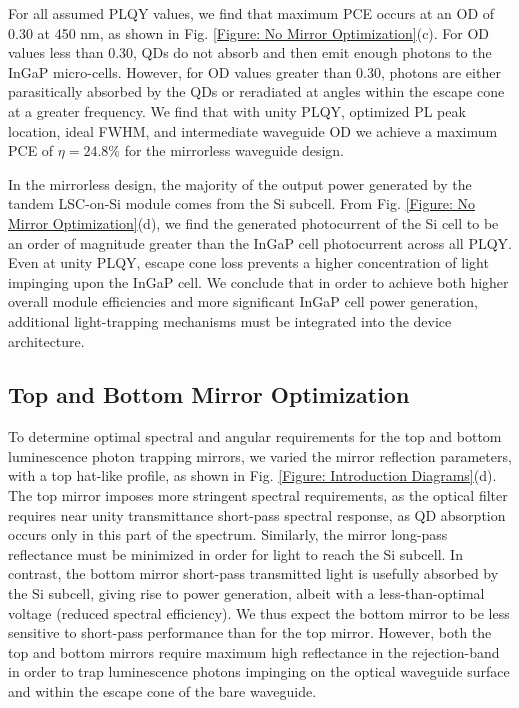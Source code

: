 \documentclass[conference]{./pvsctran}
\begin{document}
		For all assumed PLQY values, we find that maximum PCE occurs at an OD of 0.30 at 450 nm, as shown in Fig. \ref{Figure: No Mirror Optimization}(c). For OD values less than 0.30, QDs do not absorb and then emit enough photons to the InGaP micro-cells. However, for OD values greater than 0.30, photons are either parasitically absorbed by the QDs or reradiated at angles within the escape cone at a greater frequency. We find that with unity PLQY, optimized PL peak location, ideal FWHM, and intermediate waveguide OD we achieve a maximum PCE of $\eta = 24.8\%$ for the mirrorless waveguide design. 
		
		In the mirrorless design, the majority of the output power generated by the tandem LSC-on-Si module comes from the Si subcell. From Fig. \ref{Figure: No Mirror Optimization}(d), we find the generated photocurrent of the Si cell to be an order of magnitude greater than the InGaP cell photocurrent across all PLQY. Even at unity PLQY, escape cone loss prevents a higher concentration of light impinging upon the InGaP cell. We conclude that in order to achieve both higher overall module efficiencies and more significant InGaP cell power generation, additional light-trapping mechanisms must be integrated into the device architecture. 
		
		\subsection*{Top and Bottom Mirror Optimization}
		
		To determine optimal spectral and angular requirements for the top and bottom luminescence photon trapping mirrors, we varied the mirror reflection parameters, with a top hat-like profile, as shown in Fig. \ref{Figure: Introduction Diagrams}(d). The top mirror imposes more stringent spectral requirements, as the optical filter requires near unity transmittance short-pass spectral response, as QD absorption occurs only in this part of the spectrum. Similarly, the mirror long-pass reflectance must be minimized in order for light to reach the Si subcell. In contrast, the bottom mirror short-pass transmitted light is usefully absorbed by the Si subcell, giving rise to power generation, albeit with a less-than-optimal voltage (reduced spectral efficiency). We thus expect the bottom mirror to be less sensitive to short-pass performance than for the top mirror. However, both the top and bottom mirrors require maximum high reflectance in the rejection-band in order to trap luminescence photons impinging on the optical waveguide surface and within the escape cone of the bare waveguide. 
		
\end{document}
